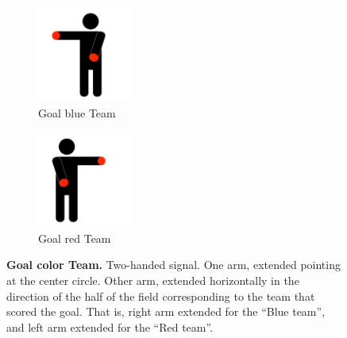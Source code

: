 \begin{figure}[ht!]
    \centering
    \begin{subfigure}{.33\textwidth}
        \centering
        \includegraphics[height=120px]{figs/technical_challenges/goal.png}
        \caption{\color{blue}Goal \textlangle{}blue\textrangle{} Team}
    \end{subfigure}
    \begin{subfigure}{.33\textwidth}
        \centering
        \includegraphics[height=120px]{figs/technical_challenges/goal-flipped.png}
        \caption{\color{red}Goal \textlangle{}red\textrangle{} Team}
    \end{subfigure}
    \caption{\textbf{Goal \textlangle{}color\textrangle{} Team.} Two-handed signal. One arm, extended pointing at the center circle. Other arm, extended horizontally in the direction of the half of the field corresponding to the team that scored the goal. That is, right arm extended for the ``Blue team'', and left arm extended for the ``Red team''.}
\end{figure}

